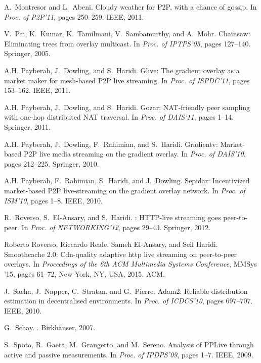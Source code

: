 {\begin{thebibliography}{5}
A.~Montresor and L.~Abeni.
\newblock Cloudy weather for {P2P}, with a chance of gossip.
\newblock In {\em Proc. of P2P'11}, pages 250--259. IEEE, 2011.

V.~Pai, K.~Kumar, K.~Tamilmani, V.~Sambamurthy, and A.~Mohr.
\newblock Chainsaw: Eliminating trees from overlay multicast.
\newblock In {\em Proc. of IPTPS'05}, pages 127--140. Springer, 2005.

A.H. Payberah, J.~Dowling, and S.~Haridi.
\newblock Glive: The gradient overlay as a market maker for mesh-based {P2P}
  live streaming.
\newblock In {\em Proc. of ISPDC'11}, pages 153--162. IEEE, 2011.

A.H. Payberah, J.~Dowling, and S.~Haridi.
\newblock Gozar: {NAT}-friendly peer sampling with one-hop distributed {NAT}
  traversal.
\newblock In {\em Proc. of DAIS'11}, pages 1--14. Springer, 2011.

A.H. Payberah, J.~Dowling, F.~Rahimian, and S.~Haridi.
\newblock Gradientv: Market-based {P2P} live media streaming on the gradient
  overlay.
\newblock In {\em Proc. of DAIS'10}, pages 212--225. Springer, 2010.

A.H. Payberah, F.~Rahimian, S.~Haridi, and J.~Dowling.
\newblock Sepidar: Incentivized market-based {P2P} live-streaming on the
  gradient overlay network.
\newblock In {\em Proc. of ISM'10}, pages 1--8. IEEE, 2010.

R.~Roverso, S.~El-Ansary, and S.~Haridi.
: {HTTP}-live streaming goes peer-to-peer.
\newblock In {\em Proc. of NETWORKING'12}, pages 29--43. Springer, 2012.

Roberto Roverso, Riccardo Reale, Sameh El-Ansary, and Seif Haridi.
\newblock Smoothcache 2.0: Cdn-quality adaptive http live streaming on
  peer-to-peer overlays.
\newblock In {\em Proceedings of the 6th ACM Multimedia Systems Conference},
  MMSys '15, pages 61--72, New York, NY, USA, 2015. ACM.

J.~Sacha, J.~Napper, C.~Stratan, and G.~Pierre.
\newblock Adam2: Reliable distribution estimation in decentralised
  environments.
\newblock In {\em Proc. of ICDCS'10}, pages 697--707. IEEE, 2010.

G.~Schay.
.
\newblock Birkh{\"a}user, 2007.

S.~Spoto, R.~Gaeta, M.~Grangetto, and M.~Sereno.
\newblock Analysis of {PPLive} through active and passive measurements.
\newblock In {\em Proc. of IPDPS'09}, pages 1--7. IEEE, 2009.


\end{thebibliography}}
